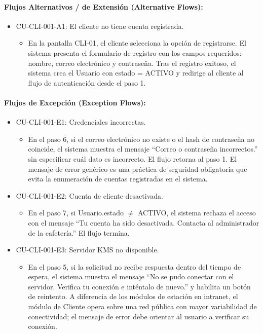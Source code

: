 \paragraph{Flujos Alternativos / de Extensión (Alternative Flows):}
\begin{itemize}
    \item CU-CLI-001-A1: El cliente no tiene cuenta registrada.
    \begin{itemize}
        \item En la pantalla CLI-01, el cliente selecciona la opción de registrarse. El sistema presenta el formulario de registro con los campos requeridos: nombre, correo electrónico y contraseña. Tras el registro exitoso, el sistema crea el Usuario con estado = ACTIVO y redirige al cliente al flujo de autenticación desde el paso 1.
    \end{itemize}
\end{itemize}

\paragraph{Flujos de Excepción (Exception Flows):}
\begin{itemize}
    \item CU-CLI-001-E1: Credenciales incorrectas.
    \begin{itemize}
        \item En el paso 6, si el correo electrónico no existe o el hash de contraseña no coincide, el sistema muestra el mensaje ``Correo o contraseña incorrectos.'' sin especificar cuál dato es incorrecto. El flujo retorna al paso 1. El mensaje de error genérico es una práctica de seguridad obligatoria que evita la enumeración de cuentas registradas en el sistema.
    \end{itemize}
    \item CU-CLI-001-E2: Cuenta de cliente desactivada.
    \begin{itemize}
        \item En el paso 7, si Usuario.estado $\neq$ ACTIVO, el sistema rechaza el acceso con el mensaje ``Tu cuenta ha sido desactivada. Contacta al administrador de la cafetería.'' El flujo termina.
    \end{itemize}
    \item CU-CLI-001-E3: Servidor KMS no disponible.
    \begin{itemize}
        \item En el paso 5, si la solicitud no recibe respuesta dentro del tiempo de espera, el sistema muestra el mensaje ``No se pudo conectar con el servidor. Verifica tu conexión e inténtalo de nuevo.'' y habilita un botón de reintento. A diferencia de los módulos de estación en intranet, el módulo de Cliente opera sobre una red pública con mayor variabilidad de conectividad; el mensaje de error debe orientar al usuario a verificar su conexión.
    \end{itemize}
\end{itemize}

